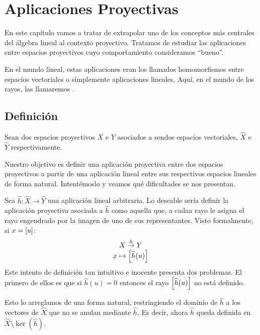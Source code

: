 \chapter{Aplicaciones Proyectivas}
\label{C4}
En este capítulo vamos a tratar de extrapolar uno de los conceptos más centrales del álgebra lineal al contexto proyectivo. Tratamos de estudiar las aplicaciones entre espacios proyectivos cuyo comportamiento consideramos ``bueno''.

En el mundo lineal, estas aplicaciones eran los llamados homomorfismos entre espacios vectoriales o símplemente aplicaciones lineales. Aquí, en el mundo de los rayos, las llamaremos .
\section{Definición}
\label{C4_definicion}
Sean dos espacios proyectivos $X$ e $Y$ asociados a sendos espacios vectoriales, $\widehat{X}$ e $\widehat{Y}$ respectivamente.

Nuestro objetivo es definir una aplicación proyectiva entre dos espacios proyectivos a partir de una aplicación lineal entre sus respectivos espacios lineales de forma natural. Intentémoslo y veamos qué dificultades se nos presentan.

Sea $\widehat{h}:\widehat{X}\to\widehat{Y}$ una aplicación lineal arbitraria. Lo deseable sería definir la aplicación proyectiva asociada a $\widehat{h}$ como aquella que, a cadaa rayo le asigna el rayo engendrado por la imagen de uno de sus representantes. Visto formalmente, si $x=\left [ u \right ]$:
\[\begin{array}{c}
X\stackrel{h}{\to}Y\\
x\mapsto\left [ \widehat{h}(u) \right ]
\end{array}\]
Este intento de definición tan intuitivo e inocente presenta dos problemas. El primero de ellos es que si $\widehat{h}(u)=0$ entonces el rayo $\left [ \widehat{h}(u) \right ]$ no está definido.

Esto lo arreglamos de una forma natural, restringiendo el dominio de $\widehat{h}$ a los vectores de $\widehat{X}$ que no se anulan mediante $\widehat{h}$. Es decir, ahora $\widehat{h}$ queda definida en $\widehat{X}\setminus \ker\left(\widehat{h}\right)$.

